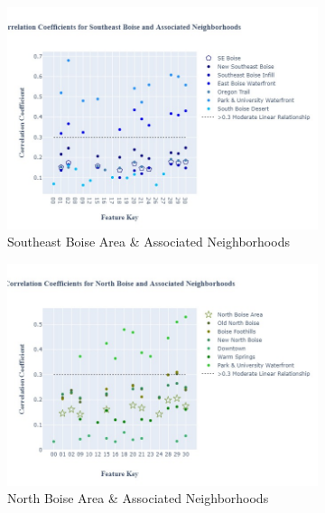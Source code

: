 \documentclass{article}
\begin{document}
\begin{figure}[H]
\begin{subfigure}[b]{0.45\textwidth}
         \includegraphics[width=\textwidth]{images/SEB_fig.jpg}
         \caption{Southeast Boise Area \& Associated Neighborhoods}
         \label{fig: se_cc}
     \end{subfigure}
          \begin{subfigure}[b]{0.45\textwidth}
         \centering
         \includegraphics[width=\textwidth]{images/NB_fig.jpg}
         \caption{North Boise Area \& Associated Neighborhoods}
         \label{fig: nb_cc}
     \end{subfigure}
               \begin{subfigure}[b]{0.45\textwidth}
         \centering

\end{subfigure}
\end{figure}
\end{document}
